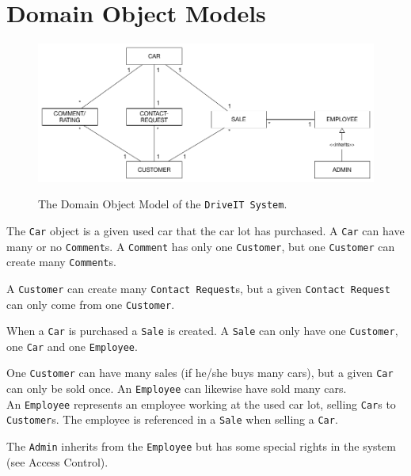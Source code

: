\section{Domain Object Models}

\begin{figure}[H]
	\centering
		\includegraphics[scale=0.35]{Figures/DomainObjectModel}\\
	\caption{The Domain Object Model of the \texttt{DriveIT System}.}
  \label{fig:DomainObjectModel}
\end{figure}

The \texttt{Car} object is a given used car that the car lot has purchased. A \texttt{Car} can have many or no \texttt{Comment}s. A \texttt{Comment} has only one \texttt{Customer}, but one \texttt{Customer} can create many \texttt{Comment}s.

A \texttt{Customer} can create many \texttt{Contact Request}s, but a given \texttt{Contact Request} can only come from one \texttt{Customer}.

When a  \texttt{Car} is purchased a \texttt{Sale} is created. A \texttt{Sale} can only have one \texttt{Customer}, one \texttt{Car} and one \texttt{Employee}.

One \texttt{Customer} can have many sales (if he/she buys many cars), but a given \texttt{Car} can only be sold once. An \texttt{Employee} can likewise have sold many cars.\\ 
An \texttt{Employee} represents an employee working at the used car lot, selling \texttt{Car}s to \texttt{Customer}s. The employee is referenced in a \texttt{Sale} when selling a \texttt{Car}.  

The \texttt{Admin} inherits from the \texttt{Employee} but has some special rights in the system (see Access Control).